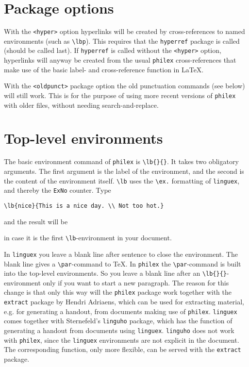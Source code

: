 \documentclass[10pt]{article}
\begin{document}
\section{Package options}
With  the \verb+<hyper>+ option hyperlinks will be created by cross-references to named environments (such as \verb+\lbp+). This requires that the \verb+hyperref+ package is called (should be called last). If \verb+hyperref+ is called without the \verb+<hyper>+ option, hyperlinks will anyway be created from the usual \verb+philex+ cross-references that make use of the basic label- and cross-reference function in LaTeX.

With the \verb+<oldpunct>+ package option  the old punctuation commands (see below) will still work. This is for the purpose of using more recent versions of \verb+philex+ with older files, without needing search-and-replace.

\section{Top-level environments}
The basic environment command of \verb+philex+ is  \verb+\lb{}{}+. It takes two obligatory arguments. The first argument is the label of the environment, and the second is the content of the environment itself. \verb+\lb+ uses the \verb+\ex.+ formatting of \verb+linguex+, and thereby the \verb+ExNo+ counter. Type 

\begin{verbatim}
\lb{nice}{This is a nice day. \\ Not too hot.}
\end{verbatim}
and the result will be

in case it is the first  \verb+\lb+-environment in your document. 

In \verb+linguex+ you leave a blank line after sentence to close the environment. The blank line gives a \verb+\par+-command to TeX. In \verb+philex+ the \verb+\par+-command is built into the top-level environments. So you leave a blank line after an \verb+\lb{}{}+-environment only if you want to start a new paragraph. The reason for this change is that only this way will the \verb+philex+ package work together with the \verb+extract+ package by Hendri Adriaens, which can be used for extracting material, e.g. for generating a handout, from documents making use of \verb+philex+. \verb+linguex+ comes together with Sternefeld's \verb+linguho+ package, which has the function of generating a handout from documents using \verb+linguex+. \verb+linguho+ does not work with \verb+philex+, since the \verb+linguex+ environments are not explicit in the document. The corresponding function, only more flexible, can be served with the \verb+extract+ package.
\end{document}
